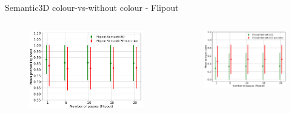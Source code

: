 \documentclass[aspectratio=169]{beamer}
\begin{document}
\begin{frame}{Semantic3D colour-vs-without colour - Flipout}
    \begin{columns}
        \begin{column}{0.5\textwidth}
            \begin{figure}
                \centering
                \includegraphics[scale=0.25]{images/ood2/Fout_MSP_OOD2.jpg}
            \end{figure}
        \end{column}
        \begin{column}{0.5\textwidth}
            \begin{figure}
                \centering
                \includegraphics[scale=0.32]{images/ood2/Fout_Ent_OOD2.jpg}

\end{figure}
\end{column}
\end{columns}
\end{frame}
\end{document}
